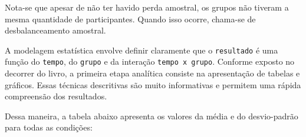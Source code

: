 \documentclass[
]{book}
\newenvironment{Shaded}{\begin{snugshade}}{\end{snugshade}}
\newcommand{\DataTypeTok}[1]{\textcolor[rgb]{0.13,0.29,0.53}{#1}}
\newcommand{\KeywordTok}[1]{\textcolor[rgb]{0.13,0.29,0.53}{\textbf{#1}}}
\newcommand{\NormalTok}[1]{#1}
\newcommand{\OperatorTok}[1]{\textcolor[rgb]{0.81,0.36,0.00}{\textbf{#1}}}
\newcommand{\OtherTok}[1]{\textcolor[rgb]{0.56,0.35,0.01}{#1}}
\newcommand{\StringTok}[1]{\textcolor[rgb]{0.31,0.60,0.02}{#1}}
\begin{document}
Nota-se que apesar de não ter havido perda amostral, os grupos não
tiveram a mesma quantidade de participantes. Quando isso ocorre,
chama-se de desbalanceamento amostral.

A modelagem estatística envolve definir claramente que o
\texttt{resultado} é uma função do \texttt{tempo}, do \texttt{grupo} e
da interação \texttt{tempo\ x\ grupo}. Conforme exposto no decorrer do
livro, a primeira etapa analítica consiste na apresentação de tabelas e
gráficos. Essas técnicas descritivas são muito informativas e permitem
uma rápida compreensão dos resultados.

Dessa maneira, a tabela abaixo apresenta os valores da média e do
desvio-padrão para todas as condições:

\begin{Shaded}
\end{Shaded}
\end{document}
